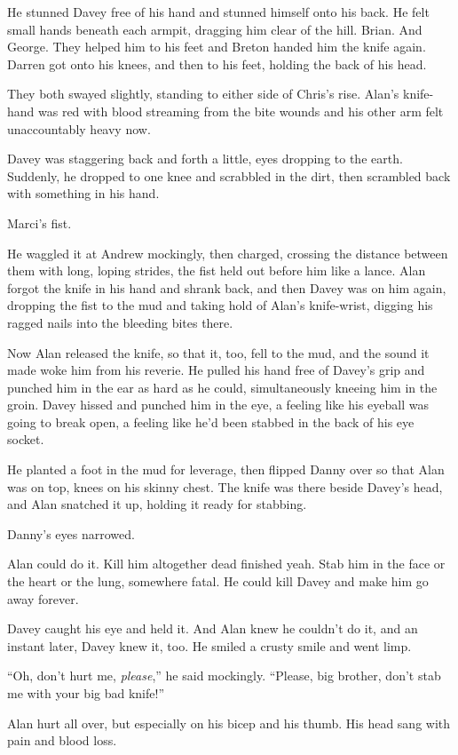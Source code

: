 He stunned Davey free of his hand and stunned himself onto his back. 
He felt small hands beneath each armpit, dragging him clear of the
hill.  Brian.  And George.  They helped him to his feet and Breton
handed him the knife again.  Darren got onto his knees, and then to
his feet, holding the back of his head.

They both swayed slightly, standing to either side of Chris's rise. 
Alan's knife-hand was red with blood streaming from the bite wounds
and his other arm felt unaccountably heavy now.

Davey was staggering back and forth a little, eyes dropping to the
earth.  Suddenly, he dropped to one knee and scrabbled in the dirt,
then scrambled back with something in his hand.

Marci's fist.

He waggled it at Andrew mockingly, then charged, crossing the distance
between them with long, loping strides, the fist held out before him
like a lance.  Alan forgot the knife in his hand and shrank back, and
then Davey was on him again, dropping the fist to the mud and taking
hold of Alan's knife-wrist, digging his ragged nails into the bleeding
bites there.

Now Alan released the knife, so that it, too, fell to the mud, and the
sound it made woke him from his reverie.  He pulled his hand free of
Davey's grip and punched him in the ear as hard as he could,
simultaneously kneeing him in the groin.  Davey hissed and punched him
in the eye, a feeling like his eyeball was going to break open, a
feeling like he'd been stabbed in the back of his eye socket.

He planted a foot in the mud for leverage, then flipped Danny over so
that Alan was on top, knees on his skinny chest.  The knife was there
beside Davey's head, and Alan snatched it up, holding it ready for
stabbing.

Danny's eyes narrowed.

Alan could do it.  Kill him altogether dead finished yeah.  Stab him
in the face or the heart or the lung, somewhere fatal.  He could kill
Davey and make him go away forever.

Davey caught his eye and held it.  And Alan knew he couldn't do it,
and an instant later, Davey knew it, too.  He smiled a crusty smile
and went limp.

``Oh, don't hurt me, \textit{please},'' he said mockingly.  ``Please,
big brother, don't stab me with your big bad knife!''

Alan hurt all over, but especially on his bicep and his thumb.  His
head sang with pain and blood loss.

